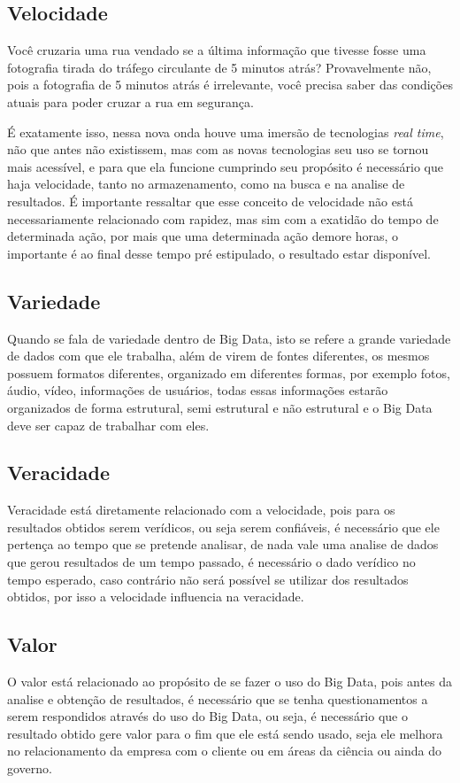 \subsection{Velocidade}
\label{subsec:velocidade}
\begin{citacao}
Você cruzaria uma rua vendado se a última informação que tivesse fosse uma fotografia tirada do tráfego circulante de 5 minutos atrás? Provavelmente não, pois a fotografia de 5 minutos atrás é irrelevante, você precisa saber das condições atuais para poder cruzar a rua em segurança.~\cite[p. 2]{forbes} 
\end{citacao}

É exatamente isso, nessa nova onda houve uma imersão de tecnologias \textit{real time}, não que antes não existissem, mas com as novas tecnologias seu uso se tornou mais acessível, e para que ela funcione cumprindo seu propósito é necessário que haja velocidade, tanto no armazenamento, como na busca e na analise de resultados. É importante ressaltar que esse conceito de velocidade não está necessariamente relacionado com rapidez, mas sim com a exatidão do tempo de determinada ação, por mais que uma determinada ação demore horas, o importante é ao final desse tempo pré estipulado, o resultado estar disponível.~\cite{forbes} 

\subsection{Variedade}
\label{subsec:variedade}
Quando se fala de variedade dentro de Big Data, isto se refere a grande variedade de dados com que ele trabalha, além de virem de fontes diferentes, os mesmos possuem formatos diferentes, organizado em diferentes formas, por exemplo fotos, áudio, vídeo, informações de usuários, todas essas informações estarão organizados de forma estrutural, semi estrutural e não estrutural e o Big Data deve ser capaz de trabalhar com eles.

\subsection{Veracidade}
\label{subsec:veracidade}
Veracidade está diretamente relacionado com a velocidade, pois para os resultados obtidos serem verídicos, ou seja serem confiáveis, é necessário que ele pertença ao tempo que se pretende analisar, de nada vale uma analise de dados que gerou resultados de um tempo passado, é necessário o dado verídico no tempo esperado, caso contrário não será possível se utilizar dos resultados obtidos, por isso a velocidade influencia na veracidade.

\subsection{Valor}
\label{subsec:valor}
O valor está relacionado ao propósito de se fazer o uso do Big Data, pois antes da analise e obtenção de resultados, é necessário que se tenha questionamentos a serem respondidos através do uso do Big Data, ou seja, é necessário que o resultado obtido gere valor para o fim que ele está sendo usado, seja ele melhora no relacionamento da empresa com o cliente ou em áreas da ciência ou ainda do governo.